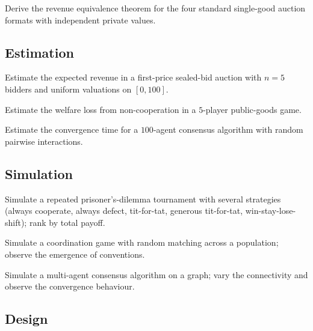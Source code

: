 \begin{exercise}
Derive the revenue equivalence theorem for the four standard single-good auction formats with independent private values.
\end{exercise}

\subsection*{Estimation}

\begin{exercise}
Estimate the expected revenue in a first-price sealed-bid auction with $n = 5$ bidders and uniform valuations on $[0, 100]$.
\end{exercise}

\begin{exercise}
Estimate the welfare loss from non-cooperation in a $5$-player public-goods game.
\end{exercise}

\begin{exercise}
Estimate the convergence time for a $100$-agent consensus algorithm with random pairwise interactions.
\end{exercise}

\subsection*{Simulation}

\begin{exercise}
Simulate a repeated prisoner's-dilemma tournament with several strategies (always cooperate, always defect, tit-for-tat, generous tit-for-tat, win-stay-lose-shift); rank by total payoff.
\end{exercise}

\begin{exercise}
Simulate a coordination game with random matching across a population; observe the emergence of conventions.
\end{exercise}

\begin{exercise}
Simulate a multi-agent consensus algorithm on a graph; vary the connectivity and observe the convergence behaviour.
\end{exercise}

\subsection*{Design}

